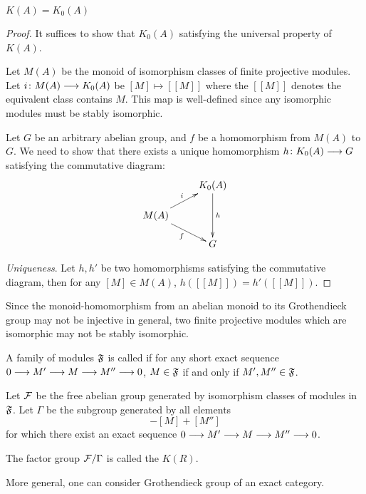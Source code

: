   \begin{prop}
    $K(A)=K_0(A)$
  \end{prop}
  \begin{proof}
    It suffices to show that $K_0(A)$ satisfying the universal property of $K(A)$.

   Let $M(A)$ be the monoid of isomorphism classes of finite projective modules. Let $i\colon M(A)\longrightarrow K_0(A)$ be $[M]\mapsto[[M]]$ where the $[[M]]$ denotes the equivalent class contains $M$. This map is well-defined since any isomorphic modules must be stably isomorphic.

    Let $G$ be an arbitrary abelian group, and $f$ be a homomorphism from $M(A)$ to $G$. We need to show that there exists a unique homomorphism $h\colon K_0(A)\longrightarrow G$ satisfying the commutative diagram:
    \begin{displaymath}
      \xymatrix@R=0.5cm{
                &         K_0(A) \ar[dd]^{h}     \\
              M(A) \ar[ur]^{i} \ar[dr]_{f}                 \\
                &         G                 }
    \end{displaymath}

    \emph{Uniqueness}. Let $h,h'$ be two homomorphisms satisfying the commutative diagram, then for any $[M]\in M(A)$, $h([[M]])=h'([[M]])$.
  \end{proof}
  \begin{warn}
    Since the monoid-homomorphism from an abelian monoid to its Grothendieck group may not be injective in general, two finite projective modules which are isomorphic may not be stably isomorphic.
  \end{warn}

  A family of modules $\mathfrak{F}$ is called  if for any short exact sequence $0\longrightarrow M'\longrightarrow M\longrightarrow M''\longrightarrow 0$, $M\in\mathfrak{F}$ if and only if $M',M''\in\mathfrak{F}$.

  Let ${\cal F}$ be the free abelian group generated by isomorphism classes of modules in $\mathfrak{F}$. Let $\Gamma$ be the subgroup generated by all elements
  \begin{equation*}
    [M']-[M]+[M'']
  \end{equation*}
  for which there exist an exact sequence $0\longrightarrow M'\longrightarrow M\longrightarrow M''\longrightarrow 0$.

  The factor group ${\cal F}/\Gamma$ is called the  $K(R)$.

  More general, one can consider Grothendieck group of an exact category.

